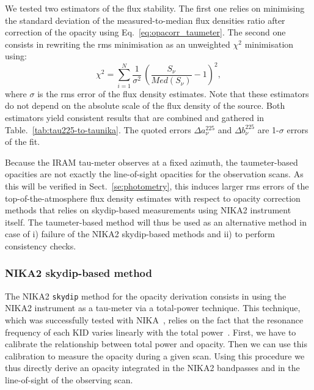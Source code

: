 We tested two estimators of the flux stability. The first one relies
on minimising the standard deviation of the measured-to-median flux
densities ratio after correction of the opacity using
Eq.~\ref{eq:opacorr_taumeter}. The second one consists in rewriting
the rms minimisation as an unweighted $\chi^2$ minimisation using:
\begin{equation}
\chi^2 = \sum_{i=1}^{N} \frac{1}{\sigma^2} \, \left( \frac{S_\nu}{Med(S_\nu)} -1 \right)^2,  
\end{equation}
where $\sigma$ is the rms error of the flux density estimates. Note
that these estimators do not depend on
the absolute scale of the flux density of the source. Both estimators
yield consistent results that are combined and gathered in
Table.~\ref{tab:tau225-to-taunika}. The quoted errors
$\Delta a_\nu^{225}$ and $\Delta b_\nu^{225}$ are 1-$\sigma$ errors of
the fit.

Because the IRAM tau-meter observes at a fixed azimuth, the
taumeter-based opacities are not exactly the line-of-sight opacities for
the observation scans. As this will be verified in
Sect.~\ref{se:photometry}, this induces larger rms errors of
the top-of-the-atmosphere flux density estimates with respect to
opacity correction methods that relies on skydip-based measurements using
NIKA2 instrument itself. The taumeter-based method will thus be used
as an alternative method in case of i) failure of the NIKA2 skydip-based
methods and ii) to perform consistency checks.



\subsubsection{NIKA2 skydip-based method}
\label{se:skydip-method}

The NIKA2 {\tt skydip} method for the opacity derivation consists in
using the NIKA2 instrument as a tau-meter via a total-power
technique. This technique, which was successfully tested with
NIKA~\citep{Catalano2014}, relies on the fact that the
resonance frequency of each KID varies linearly with the total
power~\citep{Swenson2010}. First, we have to calibrate the relationship between total
power and opacity. Then we can use this calibration to measure the
opacity during a given scan. Using this procedure we thus directly
derive an opacity integrated in the NIKA2 bandpasses and in the
line-of-sight of the observing scan.

